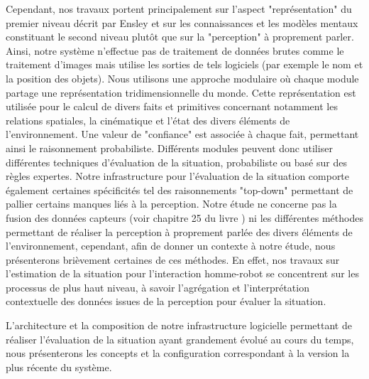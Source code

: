 \documentclass[a4paper,11pt,twoside]{StyleThese}
\begin{document}
Cependant, nos travaux portent principalement sur l'aspect "représentation" du premier niveau décrit par Ensley et sur les connaissances et les modèles mentaux constituant le second niveau plutôt que sur la "perception" à proprement parler. Ainsi, notre système n'effectue pas de traitement de données brutes comme le traitement d'images mais utilise les sorties de tels logiciels (par exemple le nom et la position des objets).
Nous utilisons une approche modulaire où chaque module partage une représentation tridimensionnelle du monde. Cette représentation est utilisée pour le calcul de divers faits et primitives concernant notamment les relations spatiales, la cinématique et l'état des divers éléments de l'environnement.
Une valeur de "confiance" est associée à chaque fait, permettant ainsi le raisonnement probabiliste. Différents modules peuvent donc utiliser différentes techniques d'évaluation de la situation, probabiliste ou basé sur des règles expertes. Notre infrastructure pour l'évaluation de la situation comporte également certaines spécificités tel des raisonnements "top-down" permettant de pallier certains manques liés à la perception.
Notre étude ne concerne pas la fusion des données capteurs (voir chapitre 25 du livre \cite{siciliano2008springer}) ni les différentes méthodes permettant de réaliser la perception à proprement parlée des divers éléments de l'environnement, cependant, afin de donner un contexte à notre étude, nous présenterons brièvement certaines de ces méthodes. En effet, nos travaux sur l'estimation de la situation pour l'interaction homme-robot se concentrent sur les processus de plus haut niveau, à savoir l'agrégation et l'interprétation contextuelle des données issues de la perception pour évaluer la situation.

L'architecture et la composition de notre infrastructure logicielle permettant de réaliser l'évaluation de la situation ayant grandement évolué au cours du temps, nous présenterons les concepts et la configuration correspondant à la version la plus récente du système.

\end{document}
